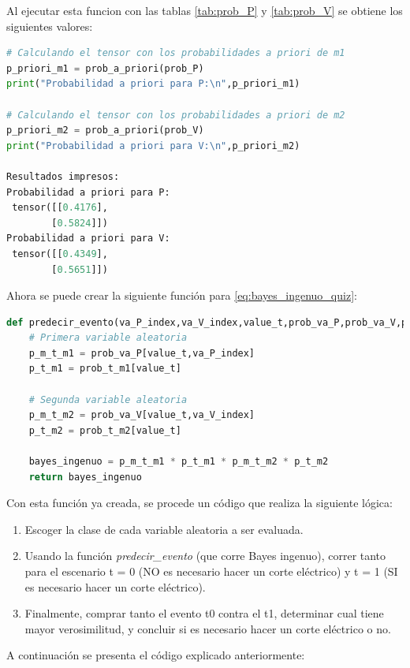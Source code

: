 \documentclass[spanish,english]{article}
\begin{document}
\begin{enumerate}
Al ejecutar esta funcion con las tablas \ref{tab:prob_P} y \ref{tab:prob_V} se obtiene los siguientes valores:

\begin{lstlisting}[language=Python]
# Calculando el tensor con los probabilidades a priori de m1
p_priori_m1 = prob_a_priori(prob_P)
print("Probabilidad a priori para P:\n",p_priori_m1)

# Calculando el tensor con los probabilidades a priori de m2
p_priori_m2 = prob_a_priori(prob_V)
print("Probabilidad a priori para V:\n",p_priori_m2)

Resultados impresos:
Probabilidad a priori para P:
 tensor([[0.4176],
        [0.5824]])
Probabilidad a priori para V:
 tensor([[0.4349],
        [0.5651]])
\end{lstlisting}

Ahora se puede crear la siguiente funci\'{o}n para \ref{eq:bayes_ingenuo_quiz}:

\begin{lstlisting}[language=Python]
def predecir_evento(va_P_index,va_V_index,value_t,prob_va_P,prob_va_V,prob_t_m1,prob_t_m2):
    # Primera variable aleatoria
    p_m_t_m1 = prob_va_P[value_t,va_P_index]
    p_t_m1 = prob_t_m1[value_t]
    
    # Segunda variable aleatoria
    p_m_t_m2 = prob_va_V[value_t,va_V_index]
    p_t_m2 = prob_t_m2[value_t]
    
    bayes_ingenuo = p_m_t_m1 * p_t_m1 * p_m_t_m2 * p_t_m2
    return bayes_ingenuo
\end{lstlisting}

Con esta funci\'{o}n ya creada, se procede un c\'{o}digo que realiza la siguiente l\'{o}gica:

\begin{enumerate}
    \item Escoger la clase de cada variable aleatoria a ser evaluada.
    \item Usando la funci\'{o}n \textit{predecir\_evento} (que corre Bayes ingenuo), correr tanto para el escenario t = 0 (NO es necesario hacer un corte el\'{e}ctrico) y t = 1 (SI es necesario hacer un corte el\'{e}ctrico).
    \item Finalmente, comprar tanto el evento t0 contra el t1, determinar cual tiene mayor verosimilitud, y concluir si es necesario hacer un corte el\'{e}ctrico o no.
\end{enumerate}

A continuaci\'{o}n se presenta el c\'{o}digo explicado anteriormente:


\end{enumerate}
\end{document}
